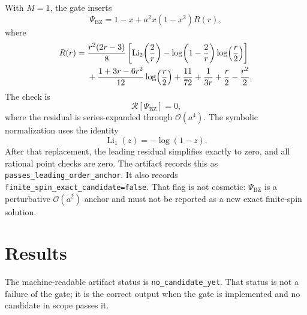 \documentclass[11pt]{article}
\newcommand{\code}[1]{\texttt{#1}}
\newcommand{\PsiBZ}{\ensuremath{\Psi_{\mathrm{BZ}}}}
\newcommand{\Residual}{\ensuremath{\mathcal{R}}}
\newcommand{\Order}[1]{\ensuremath{\mathcal{O}\!\left(#1\right)}}
\begin{document}
With $M=1$, the gate inserts
\begin{equation}
  \PsiBZ = 1-x+a^2x(1-x^2)R(r),
\end{equation}
where
\begin{align}
R(r) ={}&
\frac{r^2(2r-3)}{8}
\left[
  \operatorname{Li}_2\!\left(\frac{2}{r}\right)
  -\log\!\left(1-\frac{2}{r}\right)\log\!\left(\frac{r}{2}\right)
\right] \notag\\
&+\frac{1+3r-6r^2}{12}\log\!\left(\frac{r}{2}\right)
  +\frac{11}{72}+\frac{1}{3r}+\frac{r}{2}-\frac{r^2}{2}.
\end{align}
The check is
\begin{equation}
  [a^2]\,\Residual[\PsiBZ] = 0,
\end{equation}
where the residual is series-expanded through \Order{a^4}.  The symbolic
normalization uses the identity
\begin{equation}
  \operatorname{Li}_{1}(z)=-\log(1-z).
\end{equation}
After that replacement, the leading residual simplifies exactly to zero, and
all rational point checks are zero.  The artifact records this as
\texttt{passes\_\allowbreak leading\_\allowbreak order\_\allowbreak anchor}.  It also records
\texttt{finite\_\allowbreak spin\_\allowbreak exact\_\allowbreak candidate=false}.  That flag is not cosmetic:
\(\PsiBZ\) is a perturbative \Order{a^2} anchor and must not be reported as a
new exact finite-spin solution.

\section{Results}

The machine-readable artifact status is \code{no\_candidate\_yet}.  That status
is not a failure of the gate; it is the correct output when the gate is
implemented and no candidate in scope passes it.
\end{document}
